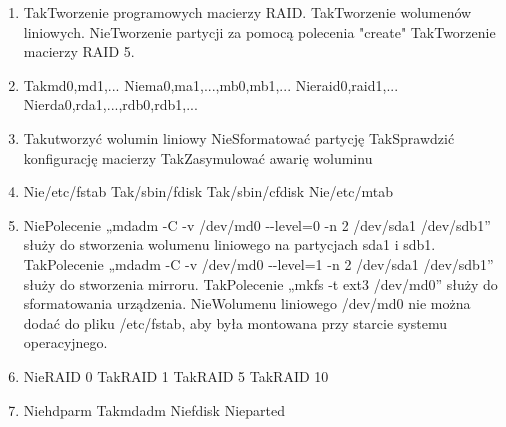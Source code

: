 \begin{enumerate}
	\newpage
	\item {}%
	{Tak}{Tworzenie programowych macierzy RAID.}%
	{Tak}{Tworzenie wolumenów liniowych.}%
	{Nie}{Tworzenie partycji za pomocą polecenia "create"}%
	{Tak}{Tworzenie macierzy RAID 5.}
	\item {}%
	{Tak}{md0,md1,...}%
	{Nie}{ma0,ma1,...,mb0,mb1,...}%
	{Nie}{raid0,raid1,...}%
	{Nie}{rda0,rda1,...,rdb0,rdb1,...}
	\item {}%
	{Tak}{utworzyć wolumin liniowy}%
	{Nie}{Sformatować partycję}%
	{Tak}{Sprawdzić konfigurację macierzy}%
	{Tak}{Zasymulować awarię woluminu}
	\item {}%
	{Nie}{/etc/fstab}%
	{Tak}{/sbin/fdisk}%
	{Tak}{/sbin/cfdisk}%
	{Nie}{/etc/mtab}
	\item {}%
	{Nie}{Polecenie „mdadm -C -v /dev/md0 -{}-level=0 -n 2 /dev/sda1 /dev/sdb1” służy do stworzenia wolumenu liniowego na partycjach sda1 i sdb1.}%
	{Tak}{Polecenie „mdadm -C -v /dev/md0 -{}-level=1 -n 2 /dev/sda1 /dev/sdb1” służy do stworzenia mirroru.}%
	{Tak}{Polecenie „mkfs -t ext3 /dev/md0” służy do sformatowania urządzenia.}%
	{Nie}{Wolumenu liniowego /dev/md0 nie można dodać do pliku /etc/fstab, aby była montowana przy starcie systemu operacyjnego.}
	\item {}%
	{Nie}{RAID 0}%
	{Tak}{RAID 1}%
	{Tak}{RAID 5}%
	{Tak}{RAID 10}
	\item {}%
	{Nie}{hdparm}%
	{Tak}{mdadm}%
	{Nie}{fdisk}%
	{Nie}{parted}
	

\end{enumerate}
